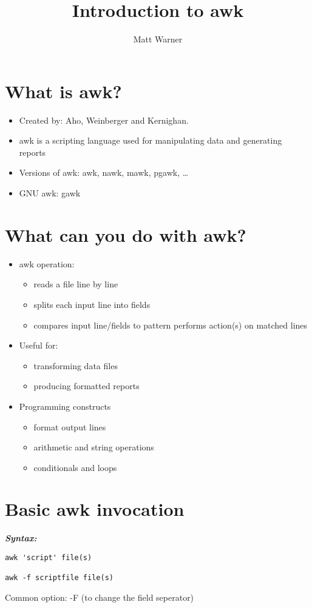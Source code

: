 \documentclass{report}
\title{\Huge{Introduction to awk}}
\author{\huge{Matt Warner}}
\date{\huge{}}
\begin{document}
  \maketitle
  \section{What is awk?}  
  \begin{itemize}
    \item Created by: 
      \subitem Aho, Weinberger and Kernighan.
    \item awk is a scripting language used for manipulating data and generating reports
    \item Versions of awk:
      \subitem awk, nawk, mawk, pgawk, \ldots
    \item GNU awk: gawk
  \end{itemize}
\section{What can you do with awk?}
\begin{itemize}
  \item awk operation: 
    \begin{itemize}[label=$\circ$]
      \item reads a file line by line 
      \item splits each input line into fields
      \item compares input line/fields to pattern
        performs action(s) on matched lines
    \end{itemize}
  \item Useful for:
    \begin{itemize}[label=$\circ$]
      \item transforming data files 
      \item producing formatted reports
    \end{itemize}
  \item Programming constructs
    \begin{itemize}[label=$\circ$]
      \item format output lines 
      \item arithmetic and string operations
      \item conditionals and loops
    \end{itemize}
\end{itemize}
\section{Basic awk invocation}
\bigbreak \noindent
\textbf{\textit{Syntax:}}
\begin{verbatim}
awk 'script' file(s)

awk -f scriptfile file(s) 
\end{verbatim}
\bigbreak \noindent
   Common option: -F (to change the field seperator)
\end{document}
